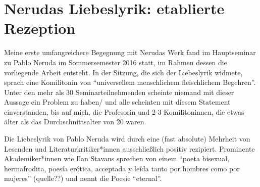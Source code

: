 \section{Nerudas Liebeslyrik: etablierte Rezeption}


Meine erste umfangreichere Begegnung mit Nerudas Werk fand im Hauptseminar zu Pablo Neruda im Sommersemester 2016 statt, im Rahmen dessen die vorliegende Arbeit entsteht.
In der Sitzung, die sich der Liebeslyrik widmete, sprach eine Komilitonin von ``universellem menschlichem fleischlichem Begehren''.
Unter den mehr als 30 Seminarteilnehmenden scheinte niemand mit dieser Aussage ein Problem zu haben/ und alle scheinten mit diesem Statement einverstanden, bis auf mich, die Profesorin und 2-3 Komilitoninnen, die etwas älter als das Durchschnittsalter von 20 waren.

Die Liebeslyrik von Pablo Neruda wird durch eine (fast absolute) Mehrheit von Lesenden und Literaturkritiker*innen ausschließlich positiv rezipiert.
Prominente Akademiker*innen wie Ilan Stavans sprechen von einem ``poeta bisexual, hermafrodita, poesía erótica, acceptada y leída tanto por hombres como por mujeres'' (quelle??)
und nennt die Poesie ``eternal''\cite{Stavans2014}.

